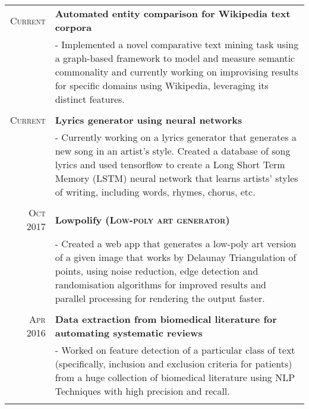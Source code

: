 \documentclass[a4paper,10pt]{extarticle} %
\begin{document}
\begin{tabular}{r|p{17.5cm}}

\textsc{Current} & \textbf{Automated entity comparison for Wikipedia text corpora} \\
& \footnotesize{- Implemented a novel comparative text mining task using a graph-based framework to model and measure semantic commonality and currently working on improvising results for specific domains using Wikipedia, leveraging its distinct features.}\\
\multicolumn{2}{c}{} \\

\textsc{Current} & \textbf{Lyrics generator using neural networks} \\
& \footnotesize{- Currently working on a lyrics generator that generates a new song in an artist's style. Created a  database of song lyrics and used tensorflow to create a Long Short Term Memory (LSTM) neural network that learns artists' styles of writing, including words, rhymes, chorus, etc.}\\
\multicolumn{2}{c}{} \\

\textsc{Oct 2017} & \textbf{Lowpolify \textsc{(Low-poly art generator)}} \\
& \footnotesize{- Created a web app that generates a low-poly art version of a given image that works by Delaunay Triangulation of points, using noise reduction, edge detection and randomisation algorithms for improved results and parallel processing for rendering the output faster.}\\
\multicolumn{2}{c}{} \\

\textsc{Apr 2016} & \textbf{Data extraction from biomedical literature for automating systematic reviews} \\
& \footnotesize{- Worked on feature detection of a particular class of text (specifically, inclusion and exclusion criteria for patients) from a huge collection of biomedical literature using NLP Techniques with high precision and recall.}\\
\multicolumn{2}{c}{} \\


\end{tabular}
\end{document}
